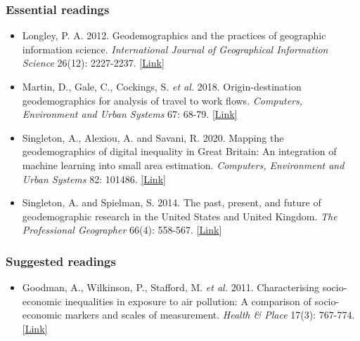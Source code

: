 \documentclass[
  letterpaper,
  DIV=11,
  numbers=noendperiod]{scrreprt}
\providecommand{\tightlist}{%
  \setlength{\itemsep}{0pt}\setlength{\parskip}{0pt}}\usepackage{longtable,booktabs,array}
\begin{document}
\hypertarget{essential-readings}{%
\subsubsection*{Essential readings}\label{essential-readings}}

\begin{itemize}
\tightlist
\item
  Longley, P. A. 2012. Geodemographics and the practices of geographic
  information science. \emph{International Journal of Geographical
  Information Science} 26(12): 2227-2237.
  \href{https://doi.org/10.1080/13658816.2012.719623}{{[}Link{]}}
\item
  Martin, D., Gale, C., Cockings, S. \emph{et al.} 2018.
  Origin-destination geodemographics for analysis of travel to work
  flows. \emph{Computers, Environment and Urban Systems} 67: 68-79.
  \href{https://doi.org/10.1016/j.compenvurbsys.2017.09.002}{{[}Link{]}}
\item
  Singleton, A., Alexiou, A. and Savani, R. 2020. Mapping the
  geodemographics of digital inequality in Great Britain: An integration
  of machine learning into small area estimation. \emph{Computers,
  Environment and Urban Systems} 82: 101486.
  \href{https://doi.org/10.1016/j.compenvurbsys.2020.101486}{{[}Link{]}}
\item
  Singleton, A. and Spielman, S. 2014. The past, present, and future of
  geodemographic research in the United States and United Kingdom.
  \emph{The Professional Geographer} 66(4): 558-567.
  \href{https://doi.org/10.1080/00330124.2013.848764}{{[}Link{]}}
\end{itemize}

\hypertarget{suggested-readings}{%
\subsubsection*{Suggested readings}\label{suggested-readings}}

\begin{itemize}
\tightlist
\item
  Goodman, A., Wilkinson, P., Stafford, M. \emph{et al.} 2011.
  Characterising socio-economic inequalities in exposure to air
  pollution: A comparison of socio-economic markers and scales of
  measurement. \emph{Health \& Place} 17(3): 767-774.
  \href{https://doi.org/10.1016/j.healthplace.2011.02.002}{{[}Link{]}}
\end{itemize}
\end{document}
